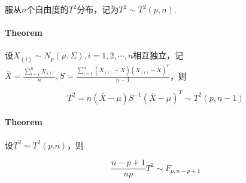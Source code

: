 \documentclass[a4paper,11pt]{article}
\begin{document}
服从$n$个自由度的$T^2$分布，记为$T^2 \sim T^2(p, n)$.

\paragraph{Theorem}
设$X_{(i)}\sim N_p(\mu, \Sigma), i=1,2,\cdots, n$相互独立，记$\bar{X} = \frac{\sum_{i=1}^nX_{(i)}}{n}, S = \frac{\sum_{i=1}^n (X_{(i)} - \bar{X})(X_{(i)} - \bar{X})^T}{n - 1}$，则

\begin{displaymath}
T^2 =n(\bar{X}-\mu)S^{-1}(\bar{X}-\mu)^T \sim T^2(p, n-1)
\end{displaymath}

\paragraph{Theorem}
设$T^2 \sim T^2(p. n)$，则

\begin{displaymath}
\frac{n - p + 1}{np}T^2 \sim F_{p, n - p + 1}
\end{displaymath} 
\end{document}

